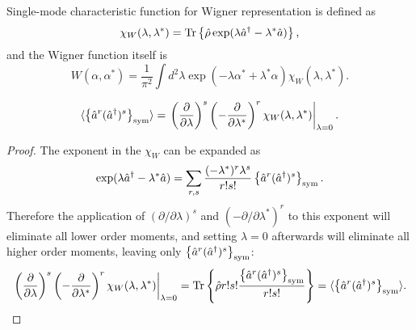 Single-mode characteristic function for Wigner representation is defined as
\[
	\chi_W (\lambda, \lambda^*)
	= \mathrm{Tr} \left\{  \hat{\rho} \exp (\lambda \hat{a}^\dagger - \lambda^* \hat{a})  \right\},
\]
and the Wigner function itself is
\[
	W (\alpha, \alpha^*)
	= \frac{1}{\pi^2} \int d^2 \lambda \exp(-\lambda \alpha^* + \lambda^* \alpha)
		\chi_W (\lambda, \lambda^*).
\]

\begin{lemma}
\label{lmm:multimode-formalism:moments-from-chi}
\[
	\langle \left\{  \hat{a}^r (\hat{a}^\dagger)^s  \right\}_{\mathrm{sym}} \rangle
	= \left.
		\left( \frac{\partial}{\partial \lambda} \right)^s
		\left( -\frac{\partial}{\partial \lambda^*} \right)^r
		\chi_W (\lambda, \lambda^*)
	\right|_{\lambda=0}.
\]
\end{lemma}
\begin{proof}
The exponent in the $\chi_W$ can be expanded as
\[
	\exp (\lambda \hat{a}^\dagger - \lambda^* \hat{a})
	= \sum\limits_{r,s}
		\frac{(-\lambda^*)^r \lambda^s}{r!s!}
		\left\{  \hat{a}^r (\hat{a}^\dagger)^s  \right\}_{\mathrm{sym}}.
\]
Therefore the application of $(\partial / \partial \lambda)^s$ and $(-\partial / \partial \lambda^*)^r$ to this exponent will eliminate all lower order moments,
and setting $\lambda = 0$ afterwards will eliminate all higher order moments,
leaving only $\left\{  \hat{a}^r (\hat{a}^\dagger)^s  \right\}_{\mathrm{sym}}$:
\[
	\left.
		\left( \frac{\partial}{\partial \lambda} \right)^s
		\left( -\frac{\partial}{\partial \lambda^*} \right)^r
		\chi_W (\lambda, \lambda^*)
	\right|_{\lambda=0}
	= \mathrm{Tr} \left\{ 
		\hat{\rho} r! s! \frac{\left\{  \hat{a}^r (\hat{a}^\dagger)^s  \right\}_{\mathrm{sym}}}{r! s!}
	 \right\}
	= \langle \left\{  \hat{a}^r (\hat{a}^\dagger)^s  \right\}_{\mathrm{sym}} \rangle.
	\qedhere
\]
\end{proof}

